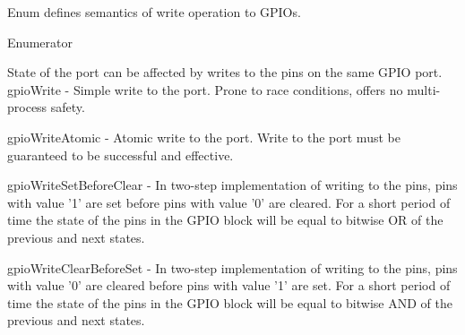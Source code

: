 Enum defines semantics of write operation to G\-P\-I\-Os. \begin{Desc}
\item[Enumerator]\par
\begin{description}
\item[{\em 
\hypertarget{class_g_p_i_ooo_ad4b133662b68989435bcd422feb0fc03a21aadd48a3896150795cd7fde8c93969}{gpio\-Write}\label{class_g_p_i_ooo_ad4b133662b68989435bcd422feb0fc03a21aadd48a3896150795cd7fde8c93969}
}]State of the port can be affected by writes to the pins on the same G\-P\-I\-O port. gpio\-Write -\/ Simple write to the port. Prone to race conditions, offers no multi-\/process safety. \item[{\em 
\hypertarget{class_g_p_i_ooo_ad4b133662b68989435bcd422feb0fc03a359f92e59dfc786c8eb730a95179fd1b}{gpio\-Write\-Atomic}\label{class_g_p_i_ooo_ad4b133662b68989435bcd422feb0fc03a359f92e59dfc786c8eb730a95179fd1b}
}]gpio\-Write\-Atomic -\/ Atomic write to the port. Write to the port must be guaranteed to be successful and effective. \item[{\em 
\hypertarget{class_g_p_i_ooo_ad4b133662b68989435bcd422feb0fc03a551b9df4fca015828bfdfbce0e4e9c31}{gpio\-Write\-Set\-Before\-Clear}\label{class_g_p_i_ooo_ad4b133662b68989435bcd422feb0fc03a551b9df4fca015828bfdfbce0e4e9c31}
}]gpio\-Write\-Set\-Before\-Clear -\/ In two-\/step implementation of writing to the pins, pins with value '1' are set before pins with value '0' are cleared. For a short period of time the state of the pins in the G\-P\-I\-O block will be equal to bitwise O\-R of the previous and next states. \item[{\em 
\hypertarget{class_g_p_i_ooo_ad4b133662b68989435bcd422feb0fc03a4b8a43356457a0d5e5994ab8f1341a7f}{gpio\-Write\-Clear\-Before\-Set}\label{class_g_p_i_ooo_ad4b133662b68989435bcd422feb0fc03a4b8a43356457a0d5e5994ab8f1341a7f}
}]gpio\-Write\-Clear\-Before\-Set -\/ In two-\/step implementation of writing to the pins, pins with value '0' are cleared before pins with value '1' are set. For a short period of time the state of the pins in the G\-P\-I\-O block will be equal to bitwise A\-N\-D of the previous and next states. \end{description}
\end{Desc}


